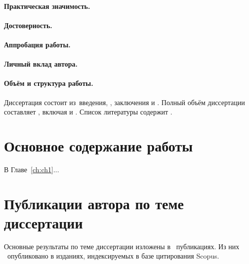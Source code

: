 \paragraph*{Практическая значимость.}
\paragraph*{Достоверность.}
\paragraph*{Аппробация работы.}
\paragraph*{Личный вклад автора.}


\paragraph*{Объём и структура работы.}
Диссертация состоит из~введения,
,
заключения и
.
%
Полный объём диссертации составляет
, включая
 и
.
Список литературы содержит
.




\newpage
\section*{Основное содержание работы}

В Главе~\ref{ch:ch1}...

\section*{Публикации автора по теме диссертации}


Основные результаты по теме диссертации изложены в \theAllMyPapers~публикациях. 
Из них
\theScopusPapers~опубликовано в изданиях, индексируемых в базе цитирования Scopus. 

